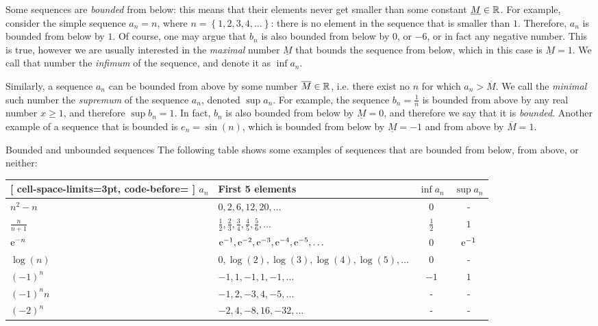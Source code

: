 Some sequences are \emph{bounded} from below: this means that their elements never get smaller than some constant $\underline{M}\in\mathbb{R}^{}$. For example, consider the simple sequence $a_{n}=n$, where $n=\left\{1,2,3,4,\dots\right\}$: there is no element in the sequence that is smaller than $1$. Therefore, $a_{n}$ is bounded from below by $1$. Of course, one may argue that $b_{n}$ is also bounded from below by $0$, or $-6$, or in fact any negative number. This is true, however we are usually interested in the \textit{maximal} number $\underline{M}$ that bounds the sequence from below, which in this case is $\underline{M}=1$. We call that number the \emph{infimum} of the sequence, and denote it as $\inf a_{n}$.

Similarly, a sequence $a_{n}$ can be bounded from above by some number $\overline{M}\in\mathbb{R}^{}$, i.e. there exist no $n$ for which $a_{n}>\overline{M}$. We call the \textit{minimal} such number the \emph{supremum} of the sequence $a_{n}$, denoted $\sup a_{n}$. For example, the sequence $b_{n}=\frac{1}{n}$ is bounded from above by any real number $x\geq1$, and therefore $\sup b_{n}=1$. In fact, $b_{n}$ is also bounded from below by $\underline{M}=0$, and therefore we say that it is \emph{bounded}. Another example of a sequence that is bounded is $e_{n}=\sin(n)$, which is bounded from below by $\underline{M}=-1$ and from above by $\overline{M}=1$.

\begin{example}{Bounded and unbounded sequences}{}
	The following table shows some examples of sequences that are bounded from below, from above, or neither:

	\begin{center}
		\begin{NiceTabular}{llcc}[
			cell-space-limits=3pt, code-before= 
			]
			\toprule
			\RowStyle{\bfseries} $a_{n}$ & First 5 elements & $\inf a_{n}$ & $\sup a_{n}$\\
			\midrule
			$n^{2}-n$ & $0,2,6,12,20,\dots$ & $0$ & - \\
			$\frac{n}{n+1}$ & $\frac{1}{2},\frac{2}{3},\frac{3}{4},\frac{4}{5},\frac{5}{6},\dots$ & $\frac{1}{2}$ & $1$ \\
			$\mathrm{e}^{-n}$ & $\mathrm{e}^{-1},\mathrm{e}^{-2},\mathrm{e}^{-3},\mathrm{e}^{-4},\mathrm{e}^{-5},\ldots$ & $0$ & $\mathrm{e}^{-1}$\\
			$\log(n)$ & $0,\log(2),\log(3),\log(4),\log(5),\dots$ & $0$ & - \\
			$(-1)^{n}$ & $-1,1,-1,1,-1,\dots$ & $-1$ & $1$\\
			$(-1)^{n}n$ & $-1,2,-3,4,-5,\ldots$ & - & - \\
			$(-2)^{n}$ & $-2,4,-8,16,-32,\dots$ & - & - \\
			\bottomrule
		\end{NiceTabular}
	\end{center}
\end{example}

